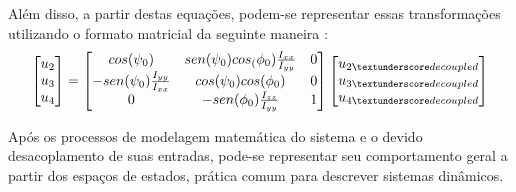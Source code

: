 Além disso, a partir destas equações, podem-se representar essas transformações utilizando o formato matricial da seguinte maneira \cite[p.~62]{Balas2007}:
\[
	\begin{bmatrix}
		u_{2} \\
		u_{3} \\
		u_{4}
	\end{bmatrix} = 
	\begin{bmatrix}
		cos(\psi_0) & sen(\psi_0)cos_(\phi_0)\frac{I_{xx}}{I_{yy}} & 
		0 \\
		
		-sen(\psi_{0})\frac{I_{yy}}{I_{xx}} &
		cos(\psi_{0})cos(\phi_{0}) &
		0 \\
		
		0 &
		-sen(\phi_{0})\frac{I_{zz}}{I_{yy}} &
		1
	\end{bmatrix}
	\begin{bmatrix}
		u_{2\textunderscore decoupled} \\
		u_{3\textunderscore decoupled} \\
		u_{4\textunderscore decoupled}
	\end{bmatrix}
\]

Após os processos de modelagem matemática do sistema e o devido desacoplamento de suas entradas, pode-se representar seu comportamento geral a partir dos espaços de estados, prática comum para descrever sistemas dinâmicos.
